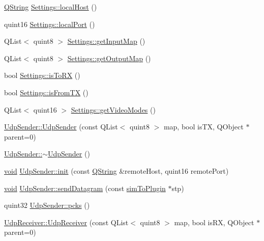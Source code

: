 \begin{DoxyCompactItemize}
\item 
\hyperlink{group___u_a_v_objects_plugin_gab9d252f49c333c94a72f97ce3105a32d}{\-Q\-String} \hyperlink{group___aero_sim_r_c_gaf2ca84445d77cc2649ac0aa4958051f0}{\-Settings\-::local\-Host} ()
\item 
quint16 \hyperlink{group___aero_sim_r_c_gadb246f8a0f4976071e8e302b553df863}{\-Settings\-::local\-Port} ()
\item 
\-Q\-List$<$ quint8 $>$ \hyperlink{group___aero_sim_r_c_ga6607c28a72f6470cd410ac7baf8fba49}{\-Settings\-::get\-Input\-Map} ()
\item 
\-Q\-List$<$ quint8 $>$ \hyperlink{group___aero_sim_r_c_ga9c382b0fc01ca068ccf9f0226d707bc9}{\-Settings\-::get\-Output\-Map} ()
\item 
bool \hyperlink{group___aero_sim_r_c_ga80495f779a8152a0c16eed12fcfd69e4}{\-Settings\-::is\-To\-R\-X} ()
\item 
bool \hyperlink{group___aero_sim_r_c_gaa18f01bc8cd2c71856c0b13cc9fc3745}{\-Settings\-::is\-From\-T\-X} ()
\item 
\-Q\-List$<$ quint16 $>$ \hyperlink{group___aero_sim_r_c_ga885d740d0bc91afd8207ef878147e0d7}{\-Settings\-::get\-Video\-Modes} ()
\item 
\hyperlink{group___aero_sim_r_c_ga33d974a790381e7266d6d4c57ca40f1f}{\-Udp\-Sender\-::\-Udp\-Sender} (const \-Q\-List$<$ quint8 $>$ map, bool is\-T\-X, \-Q\-Object $\ast$parent=0)
\item 
\hyperlink{group___aero_sim_r_c_gaa3cfe219b7bfa771b77b85dacc5d5e50}{\-Udp\-Sender\-::$\sim$\-Udp\-Sender} ()
\item 
\hyperlink{group___u_a_v_objects_plugin_ga444cf2ff3f0ecbe028adce838d373f5c}{void} \hyperlink{group___aero_sim_r_c_ga14593f9c2d83a4feb7c05639f521cd58}{\-Udp\-Sender\-::init} (const \hyperlink{group___u_a_v_objects_plugin_gab9d252f49c333c94a72f97ce3105a32d}{\-Q\-String} \&remote\-Host, quint16 remote\-Port)
\item 
\hyperlink{group___u_a_v_objects_plugin_ga444cf2ff3f0ecbe028adce838d373f5c}{void} \hyperlink{group___aero_sim_r_c_ga1c5e2d6839935b0860fc2bb6912ec125}{\-Udp\-Sender\-::send\-Datagram} (const \hyperlink{structsim_to_plugin}{sim\-To\-Plugin} $\ast$stp)
\item 
quint32 \hyperlink{group___aero_sim_r_c_gaa06c6b62e9498dee34b35c225479a52a}{\-Udp\-Sender\-::pcks} ()
\item 
\hyperlink{group___aero_sim_r_c_ga1a7699c1e29a1d7ee129c5aeecc515c5}{\-Udp\-Receiver\-::\-Udp\-Receiver} (const \-Q\-List$<$ quint8 $>$ map, bool is\-R\-X, \-Q\-Object $\ast$parent=0)

\end{DoxyCompactItemize}
